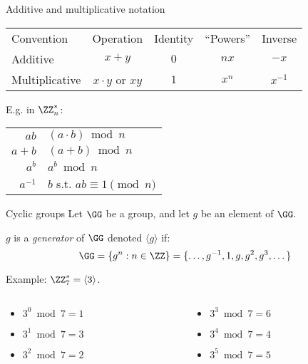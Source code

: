 \begin{frame}{Additive and multiplicative notation}
  \begin{center}
  \begin{tabular}{@{}l c c c c@{}}
    \toprule
    Convention & Operation & Identity & \enquote{Powers} & Inverse\\
    \cmidrule{1-5}
    Additive & $x + y$ & $0$ & $nx$ & $-x$\\
    \cmidrule{1-5}
    Multiplicative & $x\cdot y$ or $xy$ & $1$ & $x^n$ & $x^{-1}$\\
    \bottomrule
  \end{tabular}
  \end{center}

  \pause
  E.g. in $\ZZ_n^*$:

  \begin{tabular}{r l}
    \pause $ab$     & $(a \cdot b) \bmod{n}$\\
    \pause $a+b$    & $(a + b) \bmod{n}$\\
    \pause $a^b$    & $a^b \bmod{n}$\\
    \pause $a^{-1}$ & $b$ s.t. $ab \equiv 1 \pmod{n}$
  \end{tabular}
\end{frame}

\begin{frame}{Cyclic groups}
  \pause
  Let $\GG$ be a group, and let $g$ be an element of $\GG$.

  $g$ is a \emph{generator} of $\GG$ denoted $\langle g\rangle$ if:
  \[
    \GG = \{g^n:n\in\ZZ\} = \{\dots, g^{-1}, 1, g, g^2, g^3, \dots\}
  \]

  \pause
  Example: $\ZZ_7^* = \langle 3\rangle$.
  \pause
  \begin{columns}
    \begin{column}{0.3\textwidth}
      \begin{itemize}
        \item $3^0 \bmod{7} = 1$
        \item $3^1 \bmod{7} = 3$
        \item $3^2 \bmod{7} = 2$
      \end{itemize}
    \end{column}
    \begin{column}{0.3\textwidth}
      \begin{itemize}
        \item $3^3 \bmod{7} = 6$
        \item $3^4 \bmod{7} = 4$
        \item $3^5 \bmod{7} = 5$
      \end{itemize}
    \end{column}
  \end{columns}
\end{frame}

